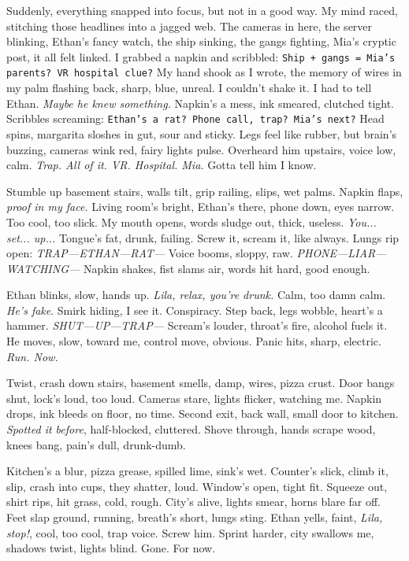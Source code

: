 \documentclass[12pt,oneside]{book}
\newcommand{\note}[1]{\texttt{#1}}
\begin{document}
Suddenly, everything snapped into focus, but not in a good way. My mind raced, stitching those headlines into a jagged web. The cameras in here, the server blinking, Ethan’s fancy watch, the ship sinking, the gangs fighting, Mia’s cryptic post, it all felt linked. I grabbed a napkin and scribbled: \note{Ship + gangs = Mia’s parents? VR hospital clue?} My hand shook as I wrote, the memory of wires in my palm flashing back, sharp, blue, unreal. I couldn’t shake it. I had to tell Ethan. \textit{Maybe he knew something.} Napkin’s a mess, ink smeared, clutched tight. Scribbles screaming: \note{Ethan’s a rat? Phone call, trap? Mia’s next?} Head spins, margarita sloshes in gut, sour and sticky. Legs feel like rubber, but brain’s buzzing, cameras wink red, fairy lights pulse. Overheard him upstairs, voice low, calm. \textit{Trap. All of it. VR. Hospital. Mia.} Gotta tell him I know.

Stumble up basement stairs, walls tilt, grip railing, slips, wet palms. Napkin flaps, \textit{proof in my face.} Living room’s bright, Ethan’s there, phone down, eyes narrow. Too cool, too slick. My mouth opens, words sludge out, thick, useless. \textit{You... set... up...} Tongue’s fat, drunk, failing. Screw it, scream it, like always. Lungs rip open: \textit{TRAP—ETHAN—RAT—} Voice booms, sloppy, raw. \textit{PHONE—LIAR—WATCHING—} Napkin shakes, fist slams air, words hit hard, good enough.

Ethan blinks, slow, hands up. \textit{Lila, relax, you’re drunk.} Calm, too damn calm. \textit{He's fake}. Smirk hiding, I see it. Conspiracy. Step back, legs wobble, heart’s a hammer. \textit{SHUT—UP—TRAP—} Scream’s louder, throat’s fire, alcohol fuels it. He moves, slow, toward me, control move, obvious. Panic hits, sharp, electric. \textit{Run. Now.}

Twist, crash down stairs, basement smells, damp, wires, pizza crust. Door bangs shut, lock’s loud, too loud. Cameras stare, lights flicker, watching me. Napkin drops, ink bleeds on floor, no time. Second exit, back wall, small door to kitchen. \textit{Spotted it before}, half-blocked, cluttered. Shove through, hands scrape wood, knees bang, pain’s dull, drunk-dumb.

Kitchen’s a blur, pizza grease, spilled lime, sink’s wet. Counter’s slick, climb it, slip, crash into cups, they shatter, loud. Window’s open, tight fit. Squeeze out, shirt rips, hit grass, cold, rough. City’s alive, lights smear, horns blare far off. Feet slap ground, running, breath’s short, lungs sting. Ethan yells, faint, \textit{Lila, stop!}, cool, too cool, trap voice. Screw him. Sprint harder, city swallows me, shadows twist, lights blind. Gone. For now.
\end{document}
